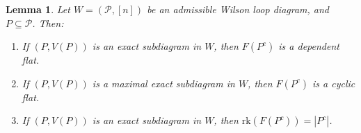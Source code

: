 \documentclass[11pt]{article}
\newcommand{\rk}{\textrm{rk} }
\newcommand{\cP}{\mathcal{P}}
\newcommand{\Prop}{\textrm{Prop}}
\newtheorem{lem}[thm]{Lemma}
\theoremstyle{remark}
\theoremstyle{definition}
\newtheorem{dfn}[thm]{Definition}
\begin{document}





\begin{lem} \label{maxexactcomplementrank}
Let $W = (\cP, [n])$ be an admissible Wilson loop diagram, and $P \subseteq \cP$. Then: \begin{enumerate}
\item If $(P,V(P))$ is an exact subdiagram in $W$, then $F(P^c)$ is a dependent flat.
\item If $(P,V(P))$ is a maximal exact subdiagram in $W$, then $F(P^c)$ is a cyclic flat.
\item If $(P,V(P))$ is an exact subdiagram in $W$, then $\rk(F(P^c)) = |P^c|$.
\end{enumerate}
\end{lem}
\end{document}
